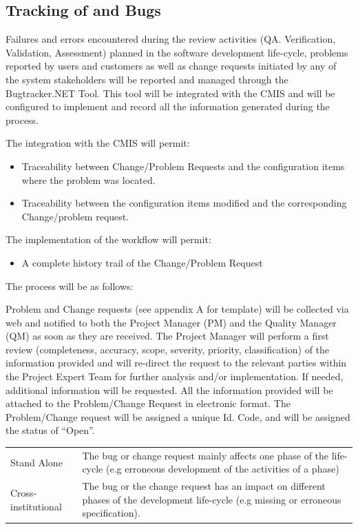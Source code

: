 \documentclass{template/openetcs_article}
\begin{document}
\subsection{Tracking of and Bugs}
Failures and errors encountered during the review activities (QA. Verification, Validation, Assessment) planned in the software development life-cycle, problems reported by users and customers as well as change requests initiated by any of the system stakeholders will be reported and managed through the Bugtracker.NET Tool. This tool will be integrated with the CMIS and will be configured to implement and record all the information generated during the process.

The integration with the CMIS will permit:
\begin{itemize}
\item Traceability between Change/Problem Requests and the configuration items where the problem was located.
\item Traceability between the configuration items modified and the corresponding Change/problem request. 
\end{itemize}
The implementation of the workflow will permit:
\begin{itemize}
\item A complete history trail of the Change/Problem Request
\end{itemize}

The process will be as follows:

Problem and Change requests (see appendix A for template) will be collected via web and notified to both the Project Manager (PM) and the Quality Manager (QM) as soon as they are received. The Project Manager will perform a first review (completeness, accuracy, scope, severity, priority, classification) of the information provided and will re-direct the request to the relevant parties within the Project Expert Team for further analysis and/or implementation. If needed, additional information will be requested. All the information provided will be attached to the Problem/Change Request in electronic format. The Problem/Change request will be assigned a unique Id. Code, and will be assigned the status of ``Open''.


\tablefirsthead{}
\tablehead{}
\tabletail{}
\tablelasttail{}
\begin{tabular}{|m{3cm}|m{11cm}|}
\hline
\rowcolor{myblue}
\multicolumn{2}{|c|}{Scope}\\\hline
Stand Alone &
The bug or change request mainly affects one phase of the life-cycle (e.g erroneous development of the activities of a phase)\\\hline
Cross-institutional &
The bug or the change request has an impact on different phases of the development life-cycle (e.g missing or erroneous specification).\\\hline
\end{tabular}
\end{document}
